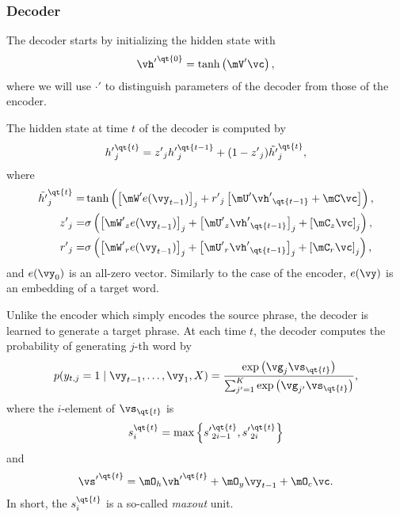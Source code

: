 \subsubsection{Decoder}

The decoder starts by initializing the hidden state with
\begin{align*}
    {\vh'}^{\qt{0}} = \tanh \left( \mV' \vc \right),
\end{align*}
where we will use $\cdot'$ to distinguish parameters of the
decoder from those of the encoder.

The hidden state at time $t$ of the decoder is computed by
\begin{align*}
    {h'}_j^{\qt{t}} = {z'}_j {h'}_j^{\qt{t-1}} +
    (1 - {z'}_j) \tilde{h'}_j^{\qt{t}},
\end{align*}
where
\begin{align*}
    \tilde{h'}_j^{\qt{t}} =& \tanh\left( 
    \left[ \mW' e(\vy_{t-1}) \right]_j + 
    {r'}_j \left[ \mU' {\vh'}_{\qt{t-1}} +
    \mC \vc 
    \right]
    \right),
    \\
    {z'}_j =& \sigma\left( \left[ {\mW'}_z e(\vy_{t-1}) \right]_j + 
    \left[{\mU'}_z {\vh'}_{\qt{t-1}}\right]_j +
    \left[\mC_z \vc \right]_j 
    \right),
    \\
    {r'}_j =& \sigma\left( \left[ {\mW'}_r e(\vy_{t-1}) \right]_j + 
    \left[{\mU'}_r {\vh'}_{\qt{t-1}}\right]_j +
    \left[ \mC_r \vc \right]_j
    \right),
\end{align*}
and $e(\vy_{0})$ is an all-zero vector. Similarly to the case of
the encoder, $e(\vy)$ is an embedding of a target word.

Unlike the encoder which simply encodes the source phrase, the
decoder is learned to generate a target phrase. At each time $t$,
the decoder computes the probability of generating $j$-th word by
\begin{align*}
    p(y_{t,j} = 1 \mid \vy_{t-1}, \dots, \vy_1, X) = \frac{\exp
        \left( {\vg}_j \vs_{\qt{t}}\right) } {\sum_{j'=1}^{K}
        \exp \left( \vg_{j'} \vs_{\qt{t}}\right) },
\end{align*}
where the $i$-element of $\vs_{\qt{t}}$ is 
\begin{align*}
    s_i^{\qt{t}} = \max\left\{
    {s'}_{2i-1}^{\qt{t}}, {s'}_{2i}^{\qt{t}}
\right\}
\end{align*}
and
\begin{align*}
    {\vs'}^{\qt{t}} = \mO_h {\vh'}^{\qt{t}} + \mO_y \vy_{t-1} + \mO_c \vc.
\end{align*}
In short, the $s_i^{\qt{t}}$ is a so-called \textit{maxout} unit.


